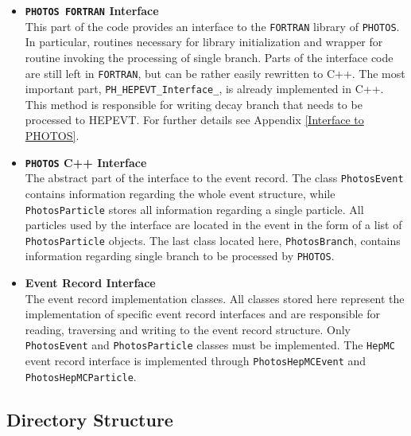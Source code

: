 \documentclass[]{Photos_interface_design}
\begin{document}
\begin{itemize}
  \item {\bf {\tt PHOTOS FORTRAN} Interface}\\
       This part of the code provides an interface 
       to the {\tt FORTRAN} library of {\tt PHOTOS}. In particular,  routines
       necessary for library initialization and wrapper for routine invoking the processing
	   of single branch. Parts of the interface code are still left in {\tt FORTRAN}, but
	   can be rather easily rewritten to C++. 
       The most important part, {\tt PH\_HEPEVT\_Interface\_},
       is already implemented  in C++. This method is responsible for writing
	   decay branch that needs to be processed to HEPEVT.
       For further details see Appendix \ref{Interface to PHOTOS}.
  \item {\bf {\tt PHOTOS} C++ Interface} \\
       The abstract part of the interface to the event record.
       The class {\tt PhotosEvent} contains information regarding the whole event
       structure, while {\tt PhotosParticle} stores all information regarding a single particle.
       All particles used by the interface are located in the event in the form of
       a list of {\tt PhotosParticle} objects.
       The last class located here, {\tt PhotosBranch}, contains information regarding
	   single branch to be processed by {\tt PHOTOS}.
  \item {\bf Event Record Interface} \\
       The event record implementation classes. All classes stored here represent
       the implementation of specific event record interfaces and are responsible for reading,
       traversing and writing to the event record structure.
       Only {\tt PhotosEvent} and {\tt PhotosParticle} classes must be implemented.
       The {\tt HepMC} event record interface is implemented
       through {\tt PhotosHepMCEvent} and {\tt PhotosHepMCParticle}.
\end{itemize}

\subsection{Directory Structure}
\end{document}

